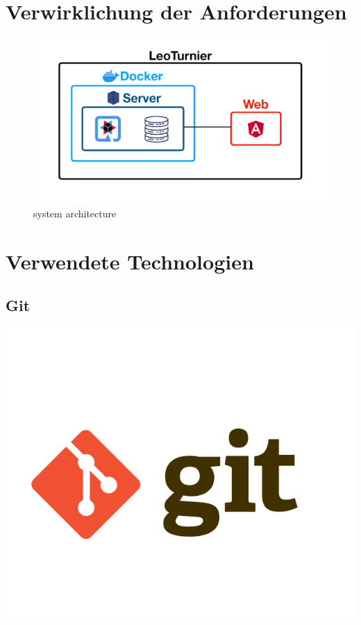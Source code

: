 \section{Verwirklichung der Anforderungen}

\begin{figure}[H]
    \centering
    \caption{system architecture}
    \includegraphics[scale=0.25]{pics/system_architecture.png}
\end{figure}


\section{Verwendete Technologien}

\subsection{Git}
\includegraphics[scale=0.05]{pics/git.png}

